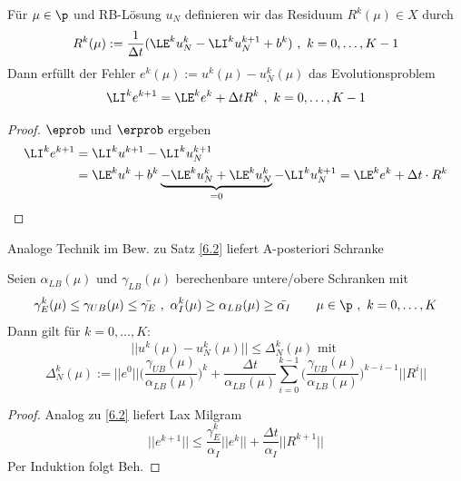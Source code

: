 \begin{lemma} \label{6.7}
Für $\mu \in \p$ und RB-Lösung $u_N$ definieren wir das Residuum $R^k(\mu) \in X$ durch
\[
	R^k(\mu) := \frac{1}{\Delta t} (\LE^k u_N^k - \LI^k u_N^{k+1} + b^k) \,\, , \,\, k=0,\dots,K-1
\]
Dann erfüllt der Fehler $e^k(\mu) := u^k(\mu) - u_N^k(\mu)$ das Evolutionsproblem
\[
	\LI^k e^{k+1} = \LE^k e^k + \Delta t R^k \,\, , \,\, k=0,\dots,K-1
\]
\begin{proof}
	$\eprob$ und $\erprob$ ergeben
	\begin{align*}
		\LI^k e^{k+1} &= \LI^k u^{k+1} - \LI^k u_N^{k+1} \\
		&= \LE^k u^k + b^k \underbrace{-\LE^k u_N^k + \LE^k u_N^k}_{=0} - \LI^k u_N^{k+1} = \LE^k e^k + \Delta t \cdot R^k
	\end{align*}
\end{proof}
\end{lemma}

Analoge Technik im Bew. zu Satz \ref{6.2} liefert A-posteriori Schranke

\begin{kor} \label{6.8}
Seien $\alpha_{LB}(\mu)$ und $\gamma_{LB}(\mu)$ berechenbare untere/obere Schranken mit
\[
	\gamma_E^k(\mu) \leq \gamma_{UB}(\mu) \leq \bar{\gamma_E} \,\, , \,\, \alpha_I^k(\mu) \geq \alpha_{LB}(\mu) \geq \bar{\alpha_I} \qquad \mu \in \p \,\, , \,\,k=0,\dots,K
\]
Dann gilt für $k=0,\dots,K$:
\[
	||u^k(\mu) - u_N^k(\mu)|| \leq \Delta_N^k(\mu) \text{ mit }
\]
\[
	\Delta_N^k(\mu) := ||e^0||\Big(\frac{\gamma_{UB}(\mu)}{\alpha_{LB}(\mu)}\Big)^k + \frac{\Delta t}{\alpha_{LB}(\mu)} \sum\limits_{i=0}^{k-1}\Big(\frac{\gamma_{UB}(\mu)}{\alpha_{LB}(\mu)}\Big)^{k-i-1} ||R^i||
\]
\begin{proof}
	Analog zu \ref{6.2} liefert Lax Milgram
	\[
		||e^{k+1}|| \leq \frac{\gamma_E^k}{\alpha_I} ||e^k|| + \frac{\Delta t}{\alpha_I} ||R^{k+1}||
	\]
	Per Induktion folgt Beh.
\end{proof}
\end{kor}

